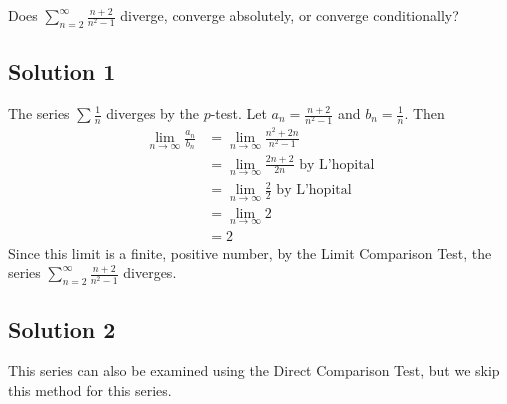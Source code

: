 \documentclass{article}
\begin{document}
\noindent
Does $\displaystyle \sum_{n=2}^\infty \frac{n+2}{n^2-1}$
diverge, converge absolutely, or converge conditionally?

\subsection*{Solution 1}

The series $\sum \frac1{n}$ diverges by the $p$-test. Let $a_n = \frac{n+2}{n^2-1}$ and $b_n=\frac1{n}$. Then
\begin{align*}
\lim_{n \to \infty} \frac{a_n}{b_n}
&= \lim_{n \to \infty} \frac{n^2+2n}{n^2-1}\\
&= \lim_{n \to \infty} \frac{2n+2}{2n} \text{ by L'hopital}\\
&= \lim_{n \to \infty} \frac{2}{2} \text{ by L'hopital}\\
&= \lim_{n \to \infty} 2 \\
&= 2
\end{align*}
Since this limit is a finite, positive number, by the Limit Comparison Test, the series $\displaystyle \sum_{n=2}^\infty \frac{n+2}{n^2-1}$ diverges.

\subsection*{Solution 2}

This series can also be examined using the Direct Comparison Test, but we skip this method for this series.
\end{document}
